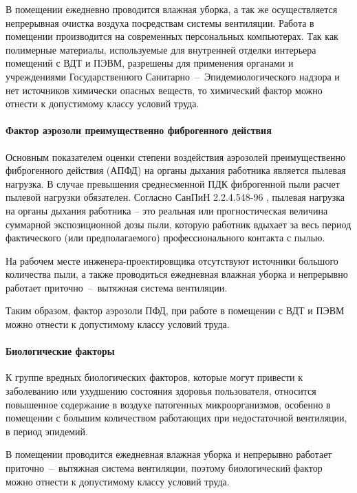 В помещении ежедневно проводится влажная уборка, а так же осуществляется непрерывная
очистка воздуха посредствам системы вентиляции. Работа в помещении производится
на современных персональных компьютерах. Так как полимерные материалы, используемые
для внутренней отделки интерьера помещений с ВДТ и ПЭВМ, разрешены для применения
органами и учреждениями Государственного Санитарно~--~Эпидемиологического надзора и
нет источников химически опасных веществ, то химический фактор можно отнести к
допустимому классу условий труда.

\paragraph{Фактор аэрозоли преимущественно фиброгенного действия}

Основным показателем оценки степени воздействия аэрозолей преимущественно фиброгенного
действия (АПФД) на органы дыхания работника является пылевая нагрузка. В случае
превышения среднесменной ПДК фиброгенной пыли расчет пылевой нагрузки обязателен.
Согласно СанПиН 2.2.4.548-96 \cite{ecology_sanpin_548_96}, пылевая нагрузка на
органы дыхания работника – это реальная или прогностическая величина суммарной
экспозиционной дозы пыли, которую работник вдыхает за весь период фактического
(или предполагаемого) профессионального контакта с пылью.

На рабочем месте инженера-проектировщика отсутствуют источники большого количества
пыли, а также проводиться ежедневная влажная уборка и непрерывно работает
приточно~--~вытяжная система вентиляции.

Таким образом, фактор аэрозоли ПФД, при работе в помещении с ВДТ и ПЭВМ можно
отнести к допустимому классу условий труда.

\paragraph{Биологические факторы}

К группе вредных биологических факторов, которые могут привести к заболеванию
или ухудшению состояния здоровья пользователя, относится повышенное содержание
в воздухе патогенных микроорганизмов, особенно в помещении с большим количеством
работающих при недостаточной вентиляции, в период эпидемий.

В помещении проводится ежедневная влажная уборка и непрерывно работает
приточно~--~вытяжная система вентиляции, поэтому биологический фактор можно отнести
к допустимому классу условий труда.

